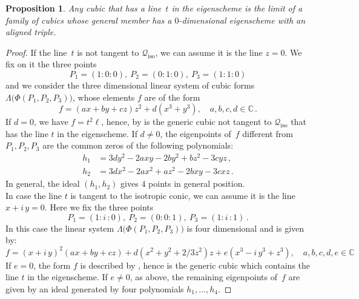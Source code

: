 \documentclass[a4paper, 11pt, reqno]{amsart}
\theoremstyle{plain}
\newtheorem{prop}[lemma]{Proposition}
\theoremstyle{definition}
\newcommand{\C}{\mathbb{C}}
\newcommand{\iii}{\textit{i}\,}
\newcommand{\iso}{\mathcal{Q}_{\mathrm{iso}}}
\begin{document}
%
\begin{prop}
\label{prop:limitCubics}
Any cubic that has a line~$t$ in the eigenscheme is the limit of a family of cubics whose general member has a $0$-dimensional eigenscheme with an aligned triple.
\end{prop}
\begin{proof}
If the line~$t$ is not tangent to $\iso$, we can assume it is the line $z=0$. We fix on it the three points
%
\[
  P_1= (1: 0: 0), \ P_2 = (0: 1: 0), \ P_3 = (1: 1: 0)
\]
%
and we consider the three dimensional linear system of cubic forms $\Lambda \bigl( \Phi(P_1, P_2, P_3) \bigr)$, whose elements $f$ are of the form
%
\[
  f = (ax + by + cz)z^2 + d(x^3+y^3), \quad a, b, c, d \in \C \,.
\]
%
If $d=0$, we have $f=t^2 \ell$, hence, by  is the 
generic cubic not tangent to $\iso$ that has the line $t$ in the eigenscheme.
If $d \neq 0$, the eigenpoints of~$f$ different from $P_1, P_2, P_3$ are
the common zeros of the following polynomials:
%
\begin{align*}
  h_1 & = 3dy^2 - 2axy - 2by^2 + bz^2 - 3cyz \,,\\
  h_2 & = 3dx^2 - 2ax^2 + az^2 - 2bxy - 3cxz \,.
\end{align*}
%
In general, the ideal $(h_1, h_2)$ gives $4$ points in 
general position. \\
In case the line $t$ is tangent to the isotropic conic, we can 
assume it is the line $x+\iii y =0$. Here we fix the three
points
\[
P_1 = (1: \iii: 0), \ P_2 = (0: 0: 1), \ P_3 = (1: \iii: 1) \,.
\]
In this case the linear system 
$\Lambda \bigl(\Phi(P_1, P_2, P_3)\bigr)$ is four dimensional and 
is given by:
\[
f = (x+\iii y)^2(ax + by+cz)+
 d(x^2 + y^2 + 2/3z^2)z+e (x^3 -\iii y^3 + z^3), 
 \quad a, b, c, d, e \in \C
\]
If $e=0$, the form $f$ is described by , hence is the generic cubic which contains the line $t$ in the eigenscheme. If $e \not= 0$, as above, 
the remaining eigenpoints of~$f$ are given by an ideal generated 
by four polynomials $h_1, \dotsc, h_4$.

\end{proof}
\end{document}
